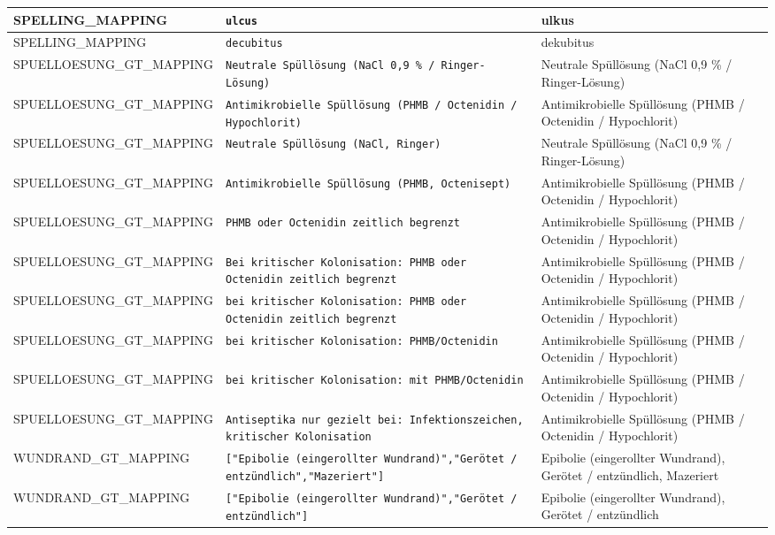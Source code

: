 \begin{longtable}{|p{3.5cm}|p{5cm}|p{6.5cm}|}
SPELLING\_MAPPING & \texttt{ulcus} & ulkus \\ \hline
SPELLING\_MAPPING & \texttt{decubitus} & dekubitus \\ \hline
SPUELLOESUNG\_GT\_MAPPING & \texttt{Neutrale Spüllösung (NaCl 0,9 \% / Ringer-Lösung)} & Neutrale Spüllösung (NaCl 0,9 \% / Ringer-Lösung) \\ \hline
SPUELLOESUNG\_GT\_MAPPING & \texttt{Antimikrobielle Spüllösung (PHMB / Octenidin / Hypochlorit)} & Antimikrobielle Spüllösung (PHMB / Octenidin / Hypochlorit) \\ \hline
SPUELLOESUNG\_GT\_MAPPING & \texttt{Neutrale Spüllösung (NaCl, Ringer)} & Neutrale Spüllösung (NaCl 0,9 \% / Ringer-Lösung) \\ \hline
SPUELLOESUNG\_GT\_MAPPING & \texttt{Antimikrobielle Spüllösung (PHMB, Octenisept)} & Antimikrobielle Spüllösung (PHMB / Octenidin / Hypochlorit) \\ \hline
SPUELLOESUNG\_GT\_MAPPING & \texttt{PHMB oder Octenidin zeitlich begrenzt} & Antimikrobielle Spüllösung (PHMB / Octenidin / Hypochlorit) \\ \hline
SPUELLOESUNG\_GT\_MAPPING & \texttt{Bei kritischer Kolonisation: PHMB oder Octenidin zeitlich begrenzt} & Antimikrobielle Spüllösung (PHMB / Octenidin / Hypochlorit) \\ \hline
SPUELLOESUNG\_GT\_MAPPING & \texttt{bei kritischer Kolonisation: PHMB oder Octenidin zeitlich begrenzt} & Antimikrobielle Spüllösung (PHMB / Octenidin / Hypochlorit) \\ \hline
SPUELLOESUNG\_GT\_MAPPING & \texttt{bei kritischer Kolonisation: PHMB/Octenidin} & Antimikrobielle Spüllösung (PHMB / Octenidin / Hypochlorit) \\ \hline
SPUELLOESUNG\_GT\_MAPPING & \texttt{bei kritischer Kolonisation: mit PHMB/Octenidin} & Antimikrobielle Spüllösung (PHMB / Octenidin / Hypochlorit) \\ \hline
SPUELLOESUNG\_GT\_MAPPING & \texttt{Antiseptika nur gezielt bei: Infektionszeichen, kritischer Kolonisation} & Antimikrobielle Spüllösung (PHMB / Octenidin / Hypochlorit) \\ \hline
WUNDRAND\_GT\_MAPPING & \texttt{["Epibolie (eingerollter Wundrand)","Gerötet / entzündlich","Mazeriert"]} & Epibolie (eingerollter Wundrand), Gerötet / entzündlich, Mazeriert \\ \hline
WUNDRAND\_GT\_MAPPING & \texttt{["Epibolie (eingerollter Wundrand)","Gerötet / entzündlich"]} & Epibolie (eingerollter Wundrand), Gerötet / entzündlich \\ \hline

\end{longtable}
